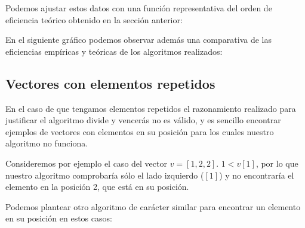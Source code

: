\pgfplotstabletypeset[
display columns/0/.style={column name=Tamaño},
display columns/1/.style={column name=Algoritmo Obvio},
display columns/2/.style={column name=Algoritmo DyV (rec)},
skip rows between index={25}{50}
]{\posObvio}

\vspace*{1cm}

Podemos ajustar estos datos con una función representativa del orden de eficiencia teórico obtenido en la sección anterior:


En el siguiente gráfico podemos observar además una comparativa de las eficiencias empíricas y teóricas de los algoritmos realizados:


\subsection{Vectores con elementos repetidos}

En el caso de que tengamos elementos repetidos el razonamiento realizado para justificar el algoritmo divide y vencerás no es válido, y es sencillo encontrar ejemplos de vectores con elementos en su posición para los cuales nuestro algoritmo no funciona.

Consideremos por ejemplo el caso del vector $v = [1,2,2]$. $1 <v[1]$, por lo que nuestro algoritmo comprobaría sólo el lado izquierdo ($[1]$) y no encontraría el elemento en la posición 2, que está en su posición.

Podemos plantear otro algoritmo de carácter similar para encontrar un elemento en su posición en estos casos:


